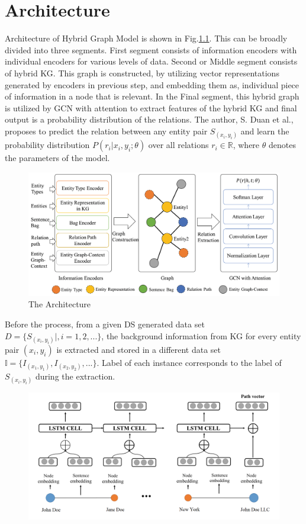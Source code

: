 \chapter{Architecture}
\label{ch:architecture}

Architecture of Hybrid Graph Model is shown in Fig.\ref{fig:arch}. This can be broadly divided into three segments. First segment consists of information encoders with individual encoders for various levels of data. Second or Middle segment consists of hybrid KG. This graph is constructed, by utilizing vector representations generated by encoders in previous step, and embedding them as, individual piece of information in a node that is relevant. In the Final segment, this hybrid graph is utilized by GCN with attention to extract features of the hybrid KG and final output is a probability distribution of the relations. The author, S. Duan et al.\cite{duan2019hybrid}, proposes to predict the relation between any entity pair $S_{(x_i, y_i)}$ and learn the probability distribution $P(r_i|x_i,y_i;\theta)$ over all relations $r_i \in \mathbb{R}$, where $\theta$ denotes the parameters of the model.

\begin{figure}[h!]
	\centering
	\includegraphics[scale=0.25]{figures/architecture.PNG}
	\caption{The Architecture}
	\label{fig:arch}
\end{figure}

\newpar
Before the process, from a given DS generated data set $D = \{S_{(x_i,y_i)}|,i = 1,2,...\}$, the background information from KG for every entity pair $(x_i, y_i)$ is extracted and stored in a different data set $\mathbb{I} = \{I_{(x_1,y_1)},I_{(x_2,y_2)},...\}$. Label of each instance corresponds to the label of $S_{(x_i, y_i)}$ during the extraction. 




\begin{figure}[h!]
	\centering
	\includegraphics[scale=0.2]{figures/LSTM.PNG}
	\label{fig:lstm}
\end{figure}